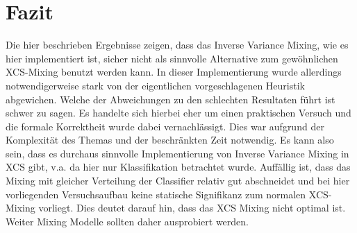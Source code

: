 \documentclass{ocsmnar}
\begin{document}
\section{Fazit}
Die hier beschrieben Ergebnisse zeigen, dass das Inverse Variance Mixing, wie es hier implementiert ist, sicher nicht als sinnvolle Alternative zum gewöhnlichen XCS-Mixing benutzt werden kann. In dieser Implementierung wurde allerdings notwendigerweise stark von der eigentlichen vorgeschlagenen Heuristik abgewichen. Welche der Abweichungen zu den schlechten Resultaten führt ist schwer zu sagen. 
Es handelte sich hierbei eher um einen praktischen Versuch und die formale Korrektheit wurde dabei vernachlässigt. Dies war aufgrund der Komplexität des Themas und der beschränkten Zeit notwendig. Es kann also sein, dass es durchaus sinnvolle Implementierung von Inverse Variance Mixing in XCS gibt, v.a. da hier nur Klassifikation betrachtet wurde. 
Auffällig ist, dass das Mixing mit gleicher Verteilung der Classifier relativ gut abschneidet und bei hier vorliegenden Versuchsaufbau keine statische Signifikanz zum normalen XCS-Mixing vorliegt. Dies deutet darauf hin, dass das XCS Mixing nicht optimal ist. Weiter Mixing Modelle sollten daher ausprobiert werden.  















\end{document}
